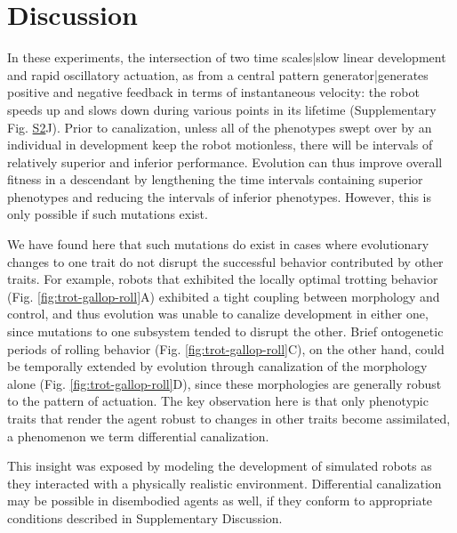 \section*{Discussion}
\label{sec:discussion}

 
In these experiments, the intersection of two time scales|slow linear development and rapid oscillatory actuation, as from a central pattern generator|generates positive and negative feedback in terms of instantaneous velocity: the robot speeds up and slows down during various points in its lifetime (Supplementary Fig. \hyperref[fig:S2]{S2}J).
Prior to canalization, unless all of the phenotypes swept over by an individual in development keep the robot motionless, there will be intervals of relatively superior and inferior performance.
Evolution can thus improve overall fitness in a descendant by lengthening the time intervals containing superior phenotypes and reducing the intervals of inferior phenotypes. However, this is only possible if such mutations exist.

We have found here that such mutations do exist in cases where evolutionary changes
to one trait do not disrupt the successful behavior contributed
by other traits.
For example,
robots that exhibited the locally optimal trotting behavior 
(Fig. \ref{fig:trot-gallop-roll}A)
exhibited a tight coupling between morphology and control, and thus evolution was 
unable to canalize development in either one, since mutations to one subsystem 
tended to disrupt the other.
Brief ontogenetic periods of rolling behavior 
(Fig. \ref{fig:trot-gallop-roll}C), 
on the other hand, could be temporally extended by evolution through canalization of the morphology alone
(Fig. \ref{fig:trot-gallop-roll}D), 
since these morphologies are generally robust to the pattern of actuation.
The key observation here is that only phenotypic traits that render the agent robust to changes in other traits become assimilated, a phenomenon we term differential canalization. 

This insight was exposed by modeling the development of simulated robots as they interacted with a physically realistic environment.
Differential canalization may be possible in disembodied agents as well, 
if they conform to appropriate conditions described in Supplementary Discussion.


